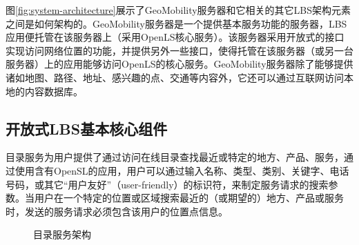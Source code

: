 \documentclass{article}
\begin{document}
\begin{CJK}{UTF8}{gbsn}
	图\ref{fig:system-architecture}展示了GeoMobility服务器和它相关的其它LBS架构元素之间是如何架构的。GeoMobility服务器是一个提供基本服务功能的服务器，LBS应用便托管在该服务器上（采用OpenLS核心服务）。该服务器采用开放式的接口实现访问网络位置的功能，并提供另外一些接口，使得托管在该服务器（或另一台服务器）上的应用能够访问OpenLS的核心服务。GeoMobility服务器除了能够提供诸如地图、路径、地址、感兴趣的点、交通等内容外，它还可以通过互联网访问本地的内容数据库。

	\subsection{开放式LBS基本核心组件}
	目录服务为用户提供了通过访问在线目录查找最近或特定的地方、产品、服务，通过使用含有OpenSL的应用，用户可以通过输入名称、类型、类别、关键字、电话号码，或其它“用户友好”（user-friendly）的标识符，来制定服务请求的搜索参数。当用户在一个特定的位置或区域搜索最近的（或期望的）地方、产品或服务时，发送的服务请求必须包含该用户的位置点信息。

	\begin{figure}[htbp]
		\centering
		\hspace{10pt} %
		\caption{目录服务架构}
	\end{figure}


\end{CJK}
\end{document}
